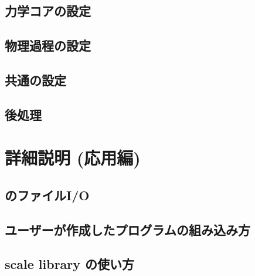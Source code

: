 \documentclass[a4paper]{jreport}
\begin{document}
 \chapter{力学コアの設定}


 \chapter{物理過程の設定} \label{sec:basic_usel_physics}

 \chapter{共通の設定}


 \chapter{後処理} \label{sec:basic_usel_post}

 \part{詳細説明 (応用編)} \label{part:advance}
 \chapter{\scalelib のファイルI/O}
 

 \chapter{ユーザーが作成したプログラムの組み込み方}
 \chapter{scale library  の使い方}
\end{document}
